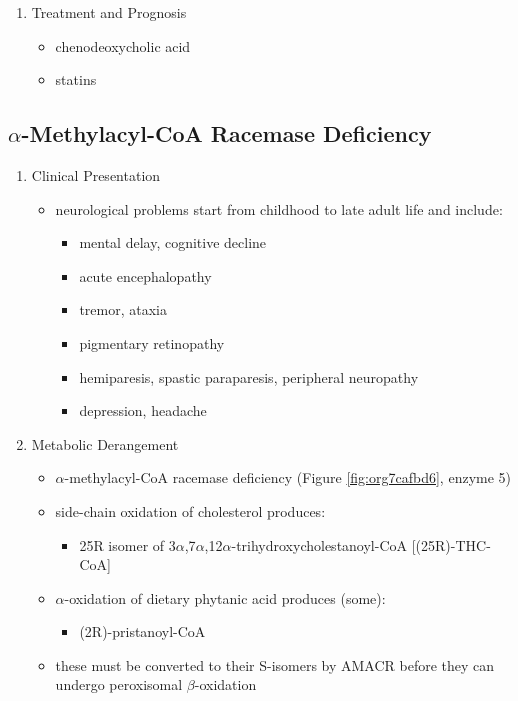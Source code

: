 \documentclass{scrartcl}
\begin{document}
\begin{enumerate}
\item Treatment and Prognosis
\label{sec:org2648983}
\begin{itemize}
\item chenodeoxycholic acid
\item statins
\end{itemize}
\end{enumerate}
\subsection{\(\alpha\)-Methylacyl-CoA Racemase Deficiency}
\label{sec:org466c40a}
\begin{enumerate}
\item Clinical Presentation
\label{sec:orged0bc49}
\begin{itemize}
\item neurological problems start from childhood to late adult life and
include:
\begin{itemize}
\item mental delay, cognitive decline
\item acute encephalopathy
\item tremor, ataxia
\item pigmentary retinopathy
\item hemiparesis, spastic paraparesis, peripheral neuropathy
\item depression, headache
\end{itemize}
\end{itemize}

\item Metabolic Derangement
\label{sec:orgcc67f42}
\begin{itemize}
\item \(\alpha\)-methylacyl-CoA racemase deficiency (Figure \ref{fig:org7cafbd6}, enzyme 5)
\item side-chain oxidation of cholesterol produces:
\begin{itemize}
\item 25R isomer of 3\(\alpha\),7\(\alpha\),12\(\alpha\)-trihydroxycholestanoyl-CoA [(25R)-THC-CoA]
\end{itemize}
\item \(\alpha\)-oxidation of dietary phytanic acid produces (some):
\begin{itemize}
\item (2R)-pristanoyl-CoA
\end{itemize}
\item these must be converted to their S-isomers by AMACR before they can
undergo peroxisomal \(\beta\)-oxidation
\end{itemize}


\end{enumerate}
\end{document}
